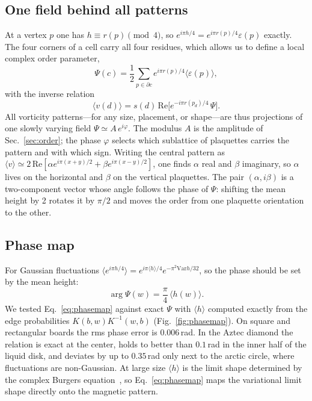 \documentclass[aps,prb,twocolumn,floatfix,longbibliography]{revtex4-2}
\newcommand{\eps}{\varepsilon}
\begin{document}
\subsection{One field behind all patterns}

At a vertex $p$ one has $h\equiv r(p)\pmod4$, so $e^{i\pi h/4}=e^{i\pi r(p)/4}\eps(p)$ exactly. The four corners of a cell carry all four residues, which allows us to define a local complex order parameter,
\begin{equation}
\Psi(c)=\frac12\sum_{p\in\partial c}e^{i\pi r(p)/4}\langle\eps(p)\rangle,
\label{eq:psi}
\end{equation}
with the inverse relation
\begin{equation}
\langle v(d)\rangle=s(d)\,\mathrm{Re}\bigl[e^{-i\pi r(p_d)/4}\,\Psi\bigr].
\label{eq:projection}
\end{equation}
All vorticity patterns---for any size, placement, or shape---are thus projections of one slowly varying field $\Psi\simeq A\,e^{i\varphi}$. The modulus $A$ is the amplitude of Sec.~\ref{sec:order}; the phase $\varphi$ selects which sublattice of plaquettes carries the pattern and with which sign. Writing the central pattern as $\langle v\rangle\simeq2\,\mathrm{Re}[\alpha e^{i\pi(x+y)/2}+\beta e^{i\pi(x-y)/2}]$, one finds $\alpha$ real and $\beta$ imaginary, so $\alpha$ lives on the horizontal and $\beta$ on the vertical plaquettes. The pair $(\alpha,i\beta)$ is a two-component vector whose angle follows the phase of $\Psi$: shifting the mean height by 2 rotates it by $\pi/2$ and moves the order from one plaquette orientation to the other.

\subsection{Phase map}

For Gaussian fluctuations $\langle e^{i\pi h/4}\rangle=e^{i\pi\langle h\rangle/4}e^{-\pi^2\mathrm{Var}h/32}$, so the phase should be set by the mean height:
\begin{equation}
\arg\Psi(w)=\frac{\pi}{4}\,\langle h(w)\rangle .
\label{eq:phasemap}
\end{equation}
We tested Eq.~\eqref{eq:phasemap} against exact $\Psi$ with $\langle h\rangle$ computed exactly from the edge probabilities $K(b,w)K^{-1}(w,b)$ (Fig.~\ref{fig:phasemap}). On square and rectangular boards the rms phase error is $0.006$\,rad. In the Aztec diamond the relation is exact at the center, holds to better than $0.1$\,rad in the inner half of the liquid disk, and deviates by up to $0.35$\,rad only next to the arctic circle, where fluctuations are non-Gaussian. At large size $\langle h\rangle$ is the limit shape determined by the complex Burgers equation~\cite{Kenyon2007,KOS2006,Cohn1996}, so Eq.~\eqref{eq:phasemap} maps the variational limit shape directly onto the magnetic pattern.
\end{document}

